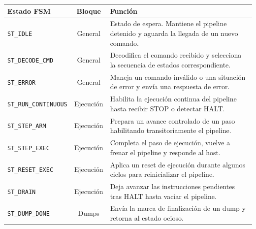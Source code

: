 \begin{center}
\begin{tabular}{|l|c|p{8.3cm}|}
\hline
\textbf{Estado FSM} & \textbf{Bloque} & \textbf{Función} \\ \hline
\texttt{ST\_IDLE} & General & Estado de espera. Mantiene el pipeline detenido y aguarda la llegada de un nuevo comando. \\ \hline
\texttt{ST\_DECODE\_CMD} & General & Decodifica el comando recibido y selecciona la secuencia de estados correspondiente. \\ \hline
\texttt{ST\_ERROR} & General & Maneja un comando inválido o una situación de error y envía una respuesta de error. \\ \hline
\texttt{ST\_RUN\_CONTINUOUS} & Ejecución & Habilita la ejecución continua del pipeline hasta recibir STOP o detectar HALT. \\ \hline
\texttt{ST\_STEP\_ARM} & Ejecución & Prepara un avance controlado de un paso habilitando transitoriamente el pipeline. \\ \hline
\texttt{ST\_STEP\_EXEC} & Ejecución & Completa el paso de ejecución, vuelve a frenar el pipeline y responde al host. \\ \hline
\texttt{ST\_RESET\_EXEC} & Ejecución & Aplica un reset de ejecución durante algunos ciclos para reinicializar el pipeline. \\ \hline
\texttt{ST\_DRAIN} & Ejecución & Deja avanzar las instrucciones pendientes tras HALT hasta vaciar el pipeline. \\ \hline
\texttt{ST\_DUMP\_DONE} & Dumps & Envía la marca de finalización de un dump y retorna al estado ocioso. \\ \hline
\end{tabular}
\end{center}

\vspace{0.8em}

